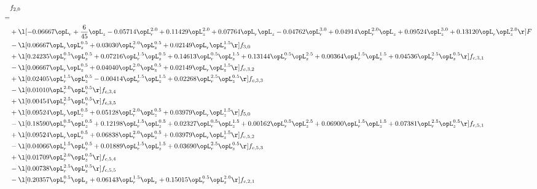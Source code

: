 \begin{alignat}{2} 
\label{eq:f_20_2} 
& f_{2,0} \nonumber \\ 
 = \\ 
& + \l[  -0.06667 \opL_r + \frac{6}{45} \opL_z   -0.05714 \opL_r^{2.0} +  0.11429 \opL_z^{2.0} +  0.07764 \opL_r \opL_z   -0.04762 \opL_r^{3.0} +  0.04914 \opL_r^{2.0} \opL_z +  0.09524 \opL_z^{3.0} +  0.13120 \opL_r \opL_z^{2.0}  \r] F \nonumber \\ 
& - \l[  0.06667 \opL_r \opL_z^{0.5} +  0.03030 \opL_r^{2.0} \opL_z^{0.5} +  0.02149 \opL_r \opL_z^{1.5}  \r] f_{3,0} \nonumber \\ 
& + \l[  0.24235 \opL_r^{0.5} \opL_z^{0.5} +  0.07216 \opL_r^{1.5} \opL_z^{0.5} +  0.14613 \opL_r^{0.5} \opL_z^{1.5} +  0.13144 \opL_r^{0.5} \opL_z^{2.5} +  0.00364 \opL_r^{1.5} \opL_z^{1.5} +  0.04536 \opL_r^{2.5} \opL_z^{0.5}  \r] f_{c,3,1} \nonumber \\ 
& - \l[  0.06667 \opL_r \opL_z^{0.5} +  0.04040 \opL_r^{2.0} \opL_z^{0.5} +  0.02149 \opL_r \opL_z^{1.5}  \r] f_{c,3,2} \nonumber \\ 
& + \l[  0.02405 \opL_r^{1.5} \opL_z^{0.5}   -0.00414 \opL_r^{1.5} \opL_z^{1.5} +  0.02268 \opL_r^{2.5} \opL_z^{0.5}  \r] f_{c,3,3} \nonumber \\ 
& - \l[  0.01010 \opL_r^{2.0} \opL_z^{0.5}  \r] f_{c,3,4} \nonumber \\ 
& + \l[  0.00454 \opL_r^{2.5} \opL_z^{0.5}  \r] f_{c,3,5} \nonumber \\ 
& + \l[  0.09524 \opL_r \opL_z^{0.5} +  0.05128 \opL_r^{2.0} \opL_z^{0.5} +  0.03979 \opL_r \opL_z^{1.5}  \r] f_{5,0} \nonumber \\ 
& - \l[  0.18590 \opL_r^{0.5} \opL_z^{0.5} +  0.12198 \opL_r^{1.5} \opL_z^{0.5} +  0.02327 \opL_r^{0.5} \opL_z^{1.5} +  0.00162 \opL_r^{0.5} \opL_z^{2.5} +  0.06900 \opL_r^{1.5} \opL_z^{1.5} +  0.07381 \opL_r^{2.5} \opL_z^{0.5}  \r] f_{c,5,1} \nonumber \\ 
& + \l[  0.09524 \opL_r \opL_z^{0.5} +  0.06838 \opL_r^{2.0} \opL_z^{0.5} +  0.03979 \opL_r \opL_z^{1.5}  \r] f_{c,5,2} \nonumber \\ 
& - \l[  0.04066 \opL_r^{1.5} \opL_z^{0.5} +  0.01889 \opL_r^{1.5} \opL_z^{1.5} +  0.03690 \opL_r^{2.5} \opL_z^{0.5}  \r] f_{c,5,3} \nonumber \\ 
& + \l[  0.01709 \opL_r^{2.0} \opL_z^{0.5}  \r] f_{c,5,4} \nonumber \\ 
& - \l[  0.00738 \opL_r^{2.5} \opL_z^{0.5}  \r] f_{c,5,5} \nonumber \\ 
& - \l[  0.20357 \opL_r^{0.5} \opL_z +  0.06143 \opL_r^{1.5} \opL_z +  0.15015 \opL_r^{0.5} \opL_z^{2.0}  \r] f_{c,2,1} \nonumber \\ 

\end{alignat}
